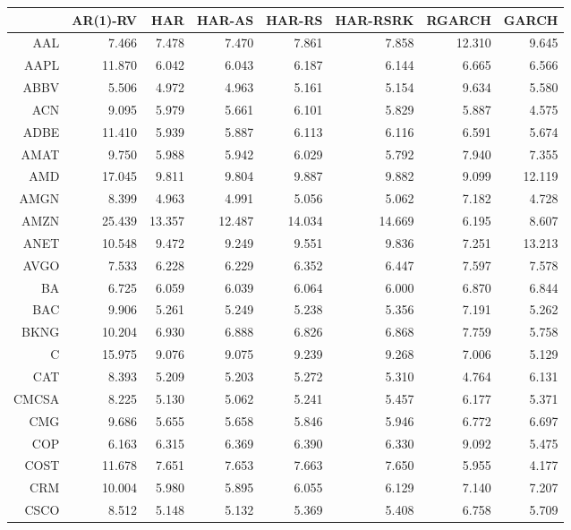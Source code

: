 \begin{table}[ht]
\centering
\begin{tabular}{rrrrrrrr}
  \hline
 & AR(1)-RV & HAR & HAR-AS & HAR-RS & HAR-RSRK & RGARCH & GARCH \\ 
  \hline
AAL & 7.466 & 7.478 & 7.470 & 7.861 & 7.858 & 12.310 & 9.645 \\ 
  AAPL & 11.870 & 6.042 & 6.043 & 6.187 & 6.144 & 6.665 & 6.566 \\ 
  ABBV & 5.506 & 4.972 & 4.963 & 5.161 & 5.154 & 9.634 & 5.580 \\ 
  ACN & 9.095 & 5.979 & 5.661 & 6.101 & 5.829 & 5.887 & 4.575 \\ 
  ADBE & 11.410 & 5.939 & 5.887 & 6.113 & 6.116 & 6.591 & 5.674 \\ 
  AMAT & 9.750 & 5.988 & 5.942 & 6.029 & 5.792 & 7.940 & 7.355 \\ 
  AMD & 17.045 & 9.811 & 9.804 & 9.887 & 9.882 & 9.099 & 12.119 \\ 
  AMGN & 8.399 & 4.963 & 4.991 & 5.056 & 5.062 & 7.182 & 4.728 \\ 
  AMZN & 25.439 & 13.357 & 12.487 & 14.034 & 14.669 & 6.195 & 8.607 \\ 
  ANET & 10.548 & 9.472 & 9.249 & 9.551 & 9.836 & 7.251 & 13.213 \\ 
  AVGO & 7.533 & 6.228 & 6.229 & 6.352 & 6.447 & 7.597 & 7.578 \\ 
  BA & 6.725 & 6.059 & 6.039 & 6.064 & 6.000 & 6.870 & 6.844 \\ 
  BAC & 9.906 & 5.261 & 5.249 & 5.238 & 5.356 & 7.191 & 5.262 \\ 
  BKNG & 10.204 & 6.930 & 6.888 & 6.826 & 6.868 & 7.759 & 5.758 \\ 
  C & 15.975 & 9.076 & 9.075 & 9.239 & 9.268 & 7.006 & 5.129 \\ 
  CAT & 8.393 & 5.209 & 5.203 & 5.272 & 5.310 & 4.764 & 6.131 \\ 
  CMCSA & 8.225 & 5.130 & 5.062 & 5.241 & 5.457 & 6.177 & 5.371 \\ 
  CMG & 9.686 & 5.655 & 5.658 & 5.846 & 5.946 & 6.772 & 6.697 \\ 
  COP & 6.163 & 6.315 & 6.369 & 6.390 & 6.330 & 9.092 & 5.475 \\ 
  COST & 11.678 & 7.651 & 7.653 & 7.663 & 7.650 & 5.955 & 4.177 \\ 
  CRM & 10.004 & 5.980 & 5.895 & 6.055 & 6.129 & 7.140 & 7.207 \\ 
  CSCO & 8.512 & 5.148 & 5.132 & 5.369 & 5.408 & 6.758 & 5.709 \\ 

\end{tabular}
\end{table}
